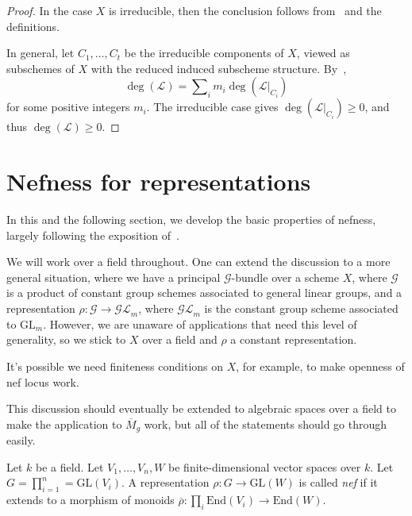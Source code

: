 \begin{proof}
In the case $X$ is irreducible, then the conclusion follows from~
and the definitions.

In general, let $C_1,\ldots,C_t$ be the irreducible components of $X$, viewed
as subschemes of $X$ with the reduced induced subscheme structure.
By~,
$$
\deg(\mathcal{L}) = \sum\nolimits_i m_i\deg(\mathcal{L}|_{C_i})
$$
for some positive integers $m_i$.
The irreducible case gives $\deg(\mathcal{L}|_{C_i}) \geq 0$, and thus
$\deg(\mathcal{L}) \geq 0$.
\end{proof}

\section{Nefness for representations}
In this and the following section, we develop the basic properties
of nefness, largely following the exposition of~\cite[Section 3]{ko90}.

\begin{remark}
We will work over a field throughout.
One can extend the discussion to a more general situation, where we have a
principal $\mathcal{G}$-bundle over a scheme $X$, where $\mathcal{G}$ is a
product of constant group schemes associated to general linear groups, and a
representation $\rho:\mathcal{G}\to\mathcal{GL}_m$, where $\mathcal{GL}_m$ is
the constant group scheme associated to $\mathrm{GL}_m$.
However, we are unaware of applications that need this level of generality, so
we stick to $X$ over a field and $\rho$ a constant representation.

It's possible we need finiteness conditions on $X$, for example, to make
openness of nef locus work.
\end{remark}

\begin{remark}
This discussion should eventually be extended to algebraic spaces over a field
to make the application to $\overline{M}_g$ work, but all of the statements
should go through easily.
\end{remark}

\begin{definition}
\label{semipos_rep_def}
Let $k$ be a field.
Let $V_1,\ldots,V_n,W$ be finite-dimensional vector spaces over $k$.
Let $G = \prod_{i=1}^n = \mathrm{GL}(V_i)$.
A representation $\rho:G \to \mathrm{GL}(W)$ is called
\textit{nef} if it extends to a morphism of monoids
$\overline{\rho} : \prod_i \mathrm{End}(V_i) \to \mathrm{End}(W)$.
\end{definition}

